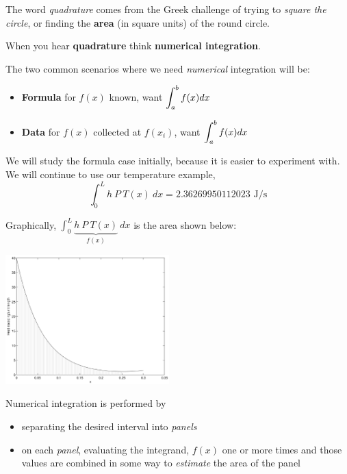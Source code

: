 The word {\em quadrature} comes from the Greek challenge of trying to
{\em square the circle}, or finding the {\bf area} (in square units)
of the round circle.

When you hear {\bf quadrature} think {\bf numerical integration}.

The two common scenarios where we need {\em numerical} integration will be:
\begin{itemize}
\item {\bf Formula} for $f(x)$ known, want $\displaystyle \int_a^b f(x) dx$
\item {\bf Data} for $f(x)$ collected at $f(x_i)$, want $\displaystyle \int_a^b f(x)
  dx$
\end{itemize}
We will study the formula case initially, because it is easier to
experiment with.  We will continue to use our temperature example,
$$
\int_0^{L} h ~P ~T(x) ~dx = 2.36269950112023 \mbox{ J/s}
$$

\newpage

Graphically, $\displaystyle \int_0^L \underbrace{h~P~T(x)}_{f(x)}~dx$
is the area shown below:
\begin{center}
\includegraphics[height=5cm]{graphics/notes_06_f_graph_with_area}
\end{center}
Numerical integration is performed by  
\begin{itemize}
\item separating the desired interval into {\em panels}
\item on each {\em panel}, evaluating the integrand, $f(x)$ one or
  more times and those values are combined in some way to {\em estimate}
  the area of the panel
\end{itemize}

\newpage

